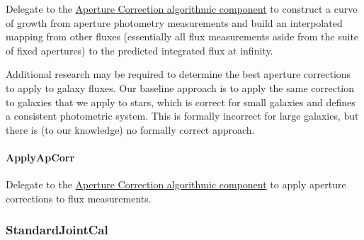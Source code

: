 Delegate to the \hyperref[sec:acApCorr]{Aperture Correction algorithmic component} to construct a curve of growth from aperture photometry measurements and build an interpolated mapping from other fluxes (essentially all flux measurements aside from the suite of fixed apertures) to the predicted integrated flux at infinity.

Additional research may be required to determine the best aperture corrections to apply to galaxy fluxes.  Our baseline approach is to apply the same correction to galaxies that we apply to stars, which is correct for small galaxies and defines a consistent photometric system.  This is formally incorrect for large galaxies, but there is (to our knowledge) no formally correct approach.

\paragraph{ApplyApCorr}
\label{sec:drpBootstrapImChar_ApplyApCorr}

Delegate to the \hyperref[sec:acApCorr]{Aperture Correction algorithmic component} to apply aperture corrections to flux measurements.

\let\hr\undefined

\subsubsection{StandardJointCal}
\label{sec:drpStandardJointCal}

